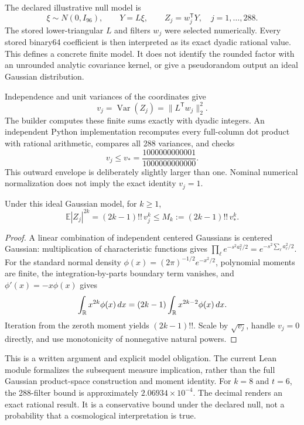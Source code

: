 The declared illustrative null model is
\[
 \xi\sim N(0,I_{96}),\qquad Y=L\xi,\qquad
 Z_j=w_j^{\mathsf T}Y,\quad j=1,\ldots,288.
\]
The stored lower-triangular \(L\) and filters \(w_j\) were selected numerically.
Every stored binary64 coefficient is then interpreted as its exact dyadic
rational value. This defines a concrete finite model. It does not identify
the rounded factor with an unrounded analytic covariance kernel, or give a
pseudorandom output an ideal Gaussian distribution.

Independence and unit variances of the coordinates give
\[
 v_j=\operatorname{Var}(Z_j)=\|L^{\mathsf T}w_j\|_2^2.
\]
The builder computes these finite sums exactly with dyadic integers. An
independent Python implementation recomputes every full-column dot product
with rational arithmetic, compares all 288 variances, and checks
\[
 v_j\leq v_*=\frac{1000000000001}{1000000000000}.
\]
This outward envelope is deliberately slightly larger than one. Nominal
numerical normalization does not imply the exact identity \(v_j=1\).

\begin{proposition}
\label{prop:workbench-gaussian-moment}
Under this ideal Gaussian model, for \(k\geq1\),
\[
 \mathbb E|Z_j|^{2k}=(2k-1)!!\,v_j^k
 \leq M_k:=(2k-1)!!\,v_*^k.
\]
\end{proposition}
\begin{proof}
A linear combination of independent centered Gaussians is centered Gaussian:
multiplication of characteristic functions gives
\(\prod_\ell e^{-s^2a_\ell^2/2}=e^{-s^2\sum_\ell a_\ell^2/2}\).
For the standard normal density
\(\phi(x)=(2\pi)^{-1/2}e^{-x^2/2}\), polynomial moments are finite,
the integration-by-parts boundary term vanishes, and \(\phi'(x)=-x\phi(x)\)
gives
\[
 \int_{\mathbb{R}}x^{2k}\phi(x)\,dx
 =(2k-1)\int_{\mathbb{R}}x^{2k-2}\phi(x)\,dx.
\]
Iteration from the zeroth moment yields \((2k-1)!!\). Scale by
\(\sqrt{v_j}\), handle \(v_j=0\) directly, and use monotonicity of
nonnegative natural powers.
\end{proof}

This is a written argument and explicit model obligation. The current Lean
module formalizes the subsequent measure implication, rather than the full
Gaussian product-space construction and moment identity. For \(k=8\) and
\(t=6\), the 288-filter bound is approximately \(2.06934\times10^{-4}\).
The decimal renders an exact rational result. It is a conservative bound
under the declared null, not a probability that a cosmological
interpretation is true.


